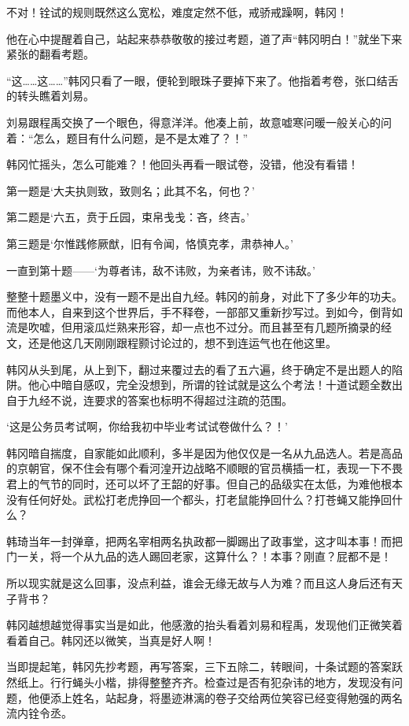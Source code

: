不对！铨试的规则既然这么宽松，难度定然不低，戒骄戒躁啊，韩冈！

他在心中提醒着自己，站起来恭恭敬敬的接过考题，道了声“韩冈明白！”就坐下来紧张的翻看考题。

“这……这……”韩冈只看了一眼，便轮到眼珠子要掉下来了。他指着考卷，张口结舌的转头瞧着刘易。

刘易跟程禹交换了一个眼色，得意洋洋。他凑上前，故意嘘寒问暖一般关心的问着：“怎么，题目有什么问题，是不是太难了？！”

韩冈忙摇头，怎么可能难？！他回头再看一眼试卷，没错，他没有看错！

第一题是‘大夫执则致，致则名；此其不名，何也？’

第二题是‘六五，贲于丘园，束帛戋戋：吝，终吉。’

第三题是‘尔惟践修厥猷，旧有令闻，恪慎克孝，肃恭神人。’

一直到第十题——‘为尊者讳，敌不讳败，为亲者讳，败不讳敌。’

整整十题墨义中，没有一题不是出自九经。韩冈的前身，对此下了多少年的功夫。而他本人，自来到这个世界后，手不释卷，一部部又重新抄写过。到如今，倒背如流是吹嘘，但用滚瓜烂熟来形容，却一点也不过分。而且甚至有几题所摘录的经文，还是他这几天刚刚跟程颢讨论过的，想不到连运气也在他这里。

韩冈从头到尾，从上到下，翻过来覆过去的看了五六遍，终于确定不是出题人的陷阱。他心中暗自感叹，完全没想到，所谓的铨试就是这么个考法！十道试题全数出自于九经不说，连要求的答案也标明不得超过注疏的范围。

‘这是公务员考试啊，你给我初中毕业考试试卷做什么？！’

韩冈暗自揣度，自家能如此顺利，多半是因为他仅仅是一名从九品选人。若是高品的京朝官，保不住会有哪个看河湟开边战略不顺眼的官员横插一杠，表现一下不畏君上的气节的同时，还可以坏了王韶的好事。但自己的品级实在太低，为难他根本没有任何好处。武松打老虎挣回一个都头，打老鼠能挣回什么？打苍蝇又能挣回什么？

韩琦当年一封弹章，把两名宰相两名执政都一脚踢出了政事堂，这才叫本事！而把门一关，将一个从九品的选人踢回老家，这算什么？！本事？刚直？屁都不是！

所以现实就是这么回事，没点利益，谁会无缘无故与人为难？而且这人身后还有天子背书？

韩冈越想越觉得事实当是如此，他感激的抬头看着刘易和程禹，发现他们正微笑着看着自己。韩冈还以微笑，当真是好人啊！

当即提起笔，韩冈先抄考题，再写答案，三下五除二，转眼间，十条试题的答案跃然纸上。行行蝇头小楷，排得整整齐齐。检查过是否有犯杂讳的地方，发现没有问题，他便添上姓名，站起身，将墨迹淋漓的卷子交给两位笑容已经变得勉强的两名流内铨令丞。

